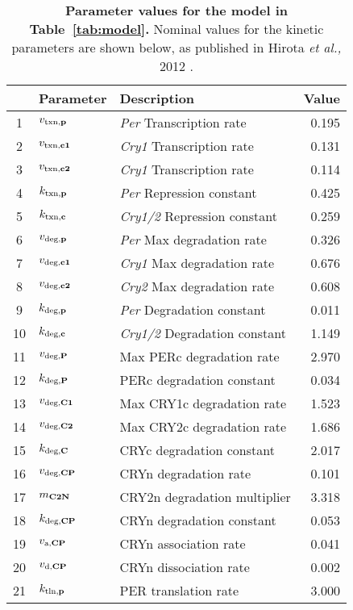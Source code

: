 \documentclass[11pt, letterpaper]{article}
\begin{document}
\begin{table}[p]
  \caption{{\bfseries Parameter values for the model in Table~\ref{tab:model}.} Nominal values for the kinetic parameters are shown below, as published in Hirota {\itshape et al.,} 2012 \cite{Hirota2012}.}
  \label{tab:parset}
  \vspace{2mm}
  \centering
  \begin{tabular}{cllr} \toprule
       & Parameter                 & Description                       & Value \\ \midrule
    1  & $v_{\text{txn,{\bf p}}}$  & {\it Per} Transcription rate      & 0.195 \\
    2  & $v_{\text{txn,{\bf c1}}}$ & {\it Cry1} Transcription rate     & 0.131 \\
    3  & $v_{\text{txn,{\bf c2}}}$ & {\it Cry1} Transcription rate     & 0.114 \\
    4  & $k_{\text{txn,{\bf p}}}$  & {\it Per} Repression constant     & 0.425 \\
    5  & $k_{\text{txn,{\bf c}}}$  & {\it Cry1/2} Repression constant  & 0.259 \\
    6  & $v_{\text{deg,{\bf p}}}$  & {\it Per} Max degradation rate    & 0.326 \\
    7  & $v_{\text{deg,{\bf c1}}}$ & {\it Cry1} Max degradation rate   & 0.676 \\
    8  & $v_{\text{deg,{\bf c2}}}$ & {\it Cry2} Max degradation rate   & 0.608 \\
    9  & $k_{\text{deg,{\bf p}}}$  & {\it Per} Degradation constant    & 0.011 \\
    10 & $k_{\text{deg,{\bf c}}}$  & {\it Cry1/2} Degradation constant & 1.149 \\
    11 & $v_{\text{deg,{\bf P}}}$  & Max PERc degradation rate         & 2.970 \\
    12 & $k_{\text{deg,{\bf P}}}$  & PERc degradation constant         & 0.034 \\
    13 & $v_{\text{deg,{\bf C1}}}$ & Max CRY1c degradation rate        & 1.523 \\
    14 & $v_{\text{deg,{\bf C2}}}$ & Max CRY2c degradation rate        & 1.686 \\
    15 & $k_{\text{deg,{\bf C}}}$  & CRYc degradation constant         & 2.017 \\
    16 & $v_{\text{deg,{\bf CP}}}$ & CRYn degradation rate             & 0.101 \\
    17 & $m_{\text{\bf C2N}}$      & CRY2n degradation multiplier      & 3.318 \\
    18 & $k_{\text{deg,{\bf CP}}}$ & CRYn degradation constant         & 0.053 \\
    19 & $v_{\text{a,{\bf CP}}}$   & CRYn association rate             & 0.041 \\
    20 & $v_{\text{d,{\bf CP}}}$   & CRYn dissociation rate            & 0.002 \\
    21 & $k_{\text{tln,{\bf p}}}$  & PER translation rate              & 3.000 \\ \bottomrule
    \hline
  \end{tabular}
\end{table}
\end{document}
